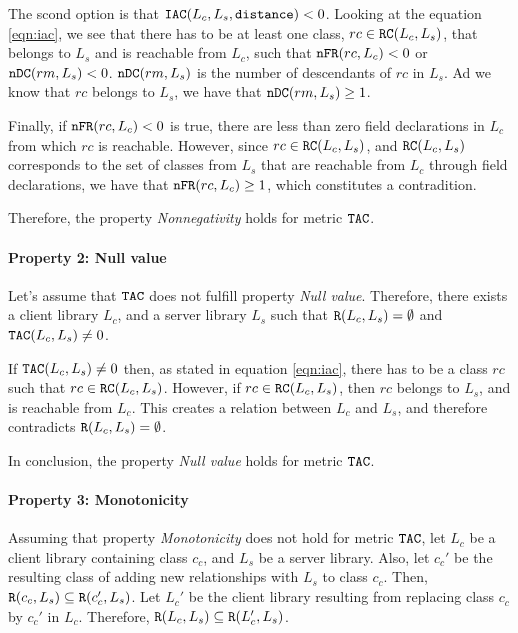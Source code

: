 The scond option is that $\verb|IAC|(L_c,L_s, \verb|distance|) < 0$. Looking at the equation \ref{eqn:iac}, we see that there has to be at least one class, $rc \in \verb|RC|(L_c,L_s)$, that belongs to $L_s$ and is reachable from $L_c$, such that $\verb|nFR|(rc,L_c) < 0$ or $\verb|nDC|(rm, L_s) < 0$. $\verb|nDC|(rm, L_s)$ is the number of descendants of $rc$ in $L_s$. Ad we know that $rc$ belongs to $L_s$, we have that $\verb|nDC|(rm, L_s) \geq 1$.

Finally, if $\verb|nFR|(rc,L_c) < 0$ is true, there are less than zero field declarations in $L_c$ from which $rc$ is reachable. However, since $rc \in \verb|RC|(L_c,L_s)$, and $\verb|RC|(L_c,L_s)$ corresponds to the set of classes from $L_s$ that are reachable from $L_c$ through field declarations, we have that $\verb|nFR|(rc,L_c) \geq 1$, which constitutes a contradition.

Therefore, the property \textit{Nonnegativity} holds for metric $\verb|TAC|$.

\paragraph{Property 2: Null value}
Let's assume that $\verb|TAC|$ does not fulfill property \textit{Null value}. Therefore, there exists a client library $L_c$, and a server library $L_s$ such that $\verb|R|(L_c, L_s) = \emptyset$ and $\verb|TAC|(L_c, L_s) \neq 0$.

If $\verb|TAC|(L_c, L_s) \neq 0$ then, as stated in equation \ref{eqn:iac}, there has to be a class $rc$ such that  $rc \in \verb|RC|(L_c,L_s)$. However, if $rc \in \verb|RC|(L_c,L_s)$, then $rc$ belongs to $L_s$, and is reachable from $L_c$. This creates a relation between $L_c$ and $L_s$, and therefore contradicts $\verb|R|(L_c, L_s) = \emptyset$.

In conclusion, the property \textit{Null value} holds for metric $\verb|TAC|$.

\paragraph{Property 3: Monotonicity}
Assuming that property \textit{Monotonicity} does not hold for metric $\verb|TAC|$, let $L_c$ be a client library containing class $c_c$, and $L_s$ be a server library. Also, let $c_c'$ be the resulting class of adding new relationships with $L_s$ to class $c_c$. Then, $\verb|R|(c_c, L_s) \subseteq \verb|R|(c_c', L_s)$. Let $L_c'$ be the client library resulting from replacing class $c_c$ by $c_c'$ in $L_c$. Therefore, $\verb|R|(L_c, L_s) \subseteq \verb|R|(L_c', L_s)$.

